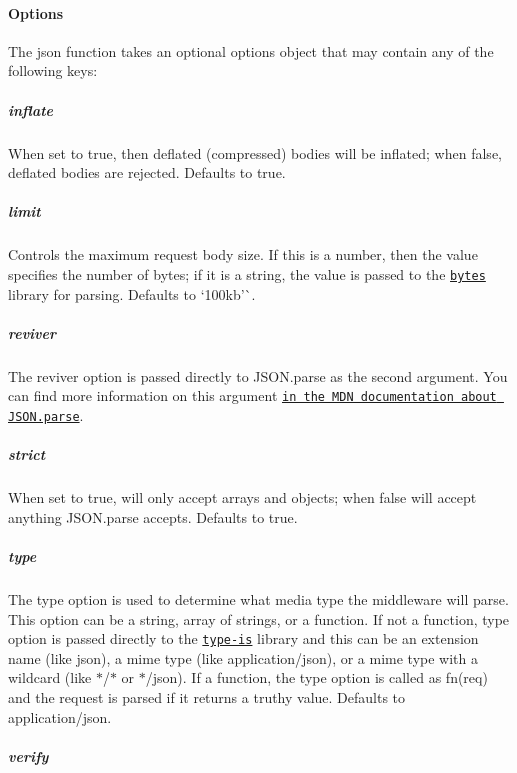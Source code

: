 \paragraph*{Options}

The {\ttfamily json} function takes an optional {\ttfamily options} object that may contain any of the following keys\+:

\subparagraph*{inflate}

When set to {\ttfamily true}, then deflated (compressed) bodies will be inflated; when {\ttfamily false}, deflated bodies are rejected. Defaults to {\ttfamily true}.

\subparagraph*{limit}

Controls the maximum request body size. If this is a number, then the value specifies the number of bytes; if it is a string, the value is passed to the \href{https://www.npmjs.com/package/bytes}{\tt bytes} library for parsing. Defaults to `\textquotesingle{}100kb'\`{}.

\subparagraph*{reviver}

The {\ttfamily reviver} option is passed directly to {\ttfamily J\+S\+O\+N.\+parse} as the second argument. You can find more information on this argument \href{https://developer.mozilla.org/en-US/docs/Web/JavaScript/Reference/Global_Objects/JSON/parse#Example.3A_Using_the_reviver_parameter}{\tt in the M\+DN documentation about J\+S\+O\+N.\+parse}.

\subparagraph*{strict}

When set to {\ttfamily true}, will only accept arrays and objects; when {\ttfamily false} will accept anything {\ttfamily J\+S\+O\+N.\+parse} accepts. Defaults to {\ttfamily true}.

\subparagraph*{type}

The {\ttfamily type} option is used to determine what media type the middleware will parse. This option can be a string, array of strings, or a function. If not a function, {\ttfamily type} option is passed directly to the \href{https://www.npmjs.org/package/type-is#readme}{\tt type-\/is} library and this can be an extension name (like {\ttfamily json}), a mime type (like {\ttfamily application/json}), or a mime type with a wildcard (like {\ttfamily $\ast$/$\ast$} or {\ttfamily $\ast$/json}). If a function, the {\ttfamily type} option is called as {\ttfamily fn(req)} and the request is parsed if it returns a truthy value. Defaults to {\ttfamily application/json}.

\subparagraph*{verify}

